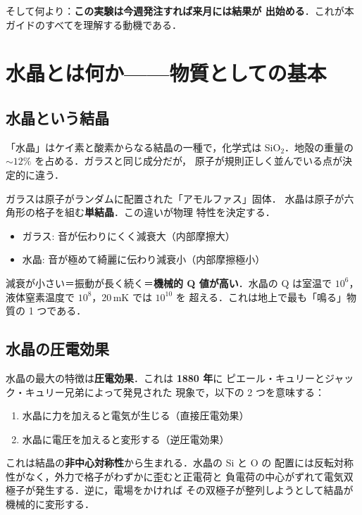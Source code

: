 \documentclass[11pt,a4paper]{article}
\begin{document}
そして何より：\textbf{この実験は今週発注すれば来月には結果が
出始める}．これが本ガイドのすべてを理解する動機である．

\section{水晶とは何か——物質としての基本}

\subsection{水晶という結晶}

「水晶」はケイ素と酸素からなる結晶の一種で，化学式は
SiO$_2$．地殻の重量の $\sim 12\%$ を占める．ガラスと同じ成分だが，
原子が規則正しく並んでいる点が決定的に違う．

ガラスは原子がランダムに配置された「アモルファス」固体．
水晶は原子が六角形の格子を組む\textbf{単結晶}．この違いが物理
特性を決定する．

\begin{itemize}
\item ガラス: 音が伝わりにくく減衰大（内部摩擦大）
\item 水晶: 音が極めて綺麗に伝わり減衰小（内部摩擦極小）
\end{itemize}

減衰が小さい＝振動が長く続く＝\textbf{機械的 Q 値が高い}．水晶の
Q は室温で $10^6$，液体窒素温度で $10^8$，20\,mK では $10^{10}$ を
超える．これは地上で最も「鳴る」物質の 1 つである．

\subsection{水晶の圧電効果}

水晶の最大の特徴は\textbf{圧電効果}．これは \textbf{1880 年}に
ピエール・キュリーとジャック・キュリー兄弟によって発見された
現象で，以下の 2 つを意味する：

\begin{enumerate}
\item 水晶に力を加えると電気が生じる（直接圧電効果）
\item 水晶に電圧を加えると変形する（逆圧電効果）
\end{enumerate}

これは結晶の\textbf{非中心対称性}から生まれる．水晶の Si と O の
配置には反転対称性がなく，外力で格子がわずかに歪むと正電荷と
負電荷の中心がずれて電気双極子が発生する．逆に，電場をかければ
その双極子が整列しようとして結晶が機械的に変形する．
\end{document}
